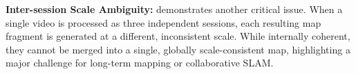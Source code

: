 \noindent \textbf{Inter-session Scale Ambiguity:}  demonstrates another critical issue. When a single video is processed as three independent sessions, each resulting map fragment is generated at a different, inconsistent scale. While internally coherent, they cannot be merged into a single, globally scale-consistent map, highlighting a major challenge for long-term mapping or collaborative SLAM.   

% 

% 

% 

% 

% 

% 
